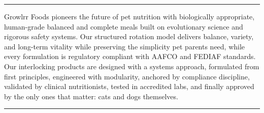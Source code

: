 
\vspace*{\fill}
\begin{center}
\begin{center}
\begin{center}
\rule{\textwidth}{0.4pt}\vspace{1em}

\begin{minipage}{0.8\textwidth}
\begin{center}

Growlrr Foods pioneers the future of pet nutrition with biologically appropriate, human-grade balanced and complete meals built on evolutionary science and rigorous safety systems. Our structured rotation model delivers balance, variety, and long-term vitality while preserving the simplicity pet parents need, while every formulation is regulatory compliant with AAFCO and FEDIAF standards. Our interlocking products are designed with a systems approach, formulated from first principles, engineered with modularity, anchored by compliance discipline, validated by clinical nutritionists, tested in accredited labs, and finally approved by the only ones that matter: cats and dogs themselves.
\end{center}
\end{minipage}

\vspace{1em}\rule{\textwidth}{0.4pt}
\end{center}\end{center}
\end{center}
\vspace*{\fill}
